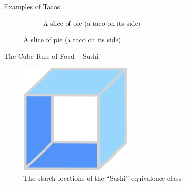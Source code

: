 \documentclass{beamer}
\begin{document}
\begin{frame}{Examples of Tacos}
\begin{figure}
\begin{subfigure}{.5\textwidth}
          \caption{\label{fig:pie-slices}A slice of pie (a taco on its side)}
        \end{subfigure}
    \end{figure}
\end{frame}

\begin{frame}{The Cube Rule of Food -- Sushi}
    \begin{figure}
        \includegraphics[width=0.5\textwidth]{sushi/21_sushi.jpg}
        \caption{\label{fig:sushi-diagram}The starch locations of the ``Sushi'' equivalence class}
    \end{figure}
\end{frame}
\end{document}
